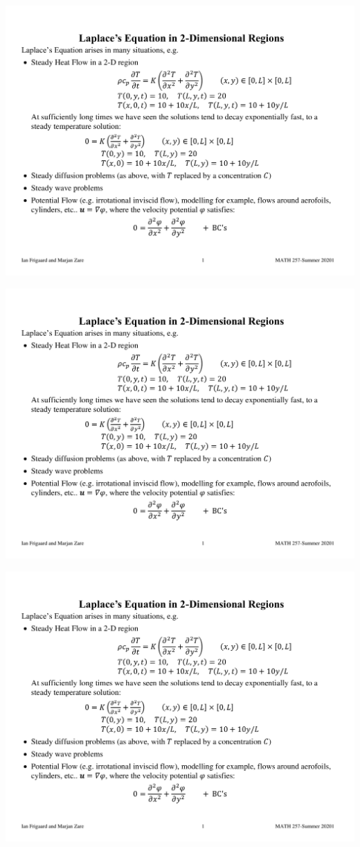 \documentclass{article}
\begin{document}
\includegraphics[page=2, width = 0.8 \textwidth]{Laplace Equation.pdf}

\includegraphics[page=4, width = 0.8 \textwidth]{Laplace Equation.pdf}

\includegraphics[page=5, width = 0.8 \textwidth]{Laplace Equation.pdf}
\end{document}
